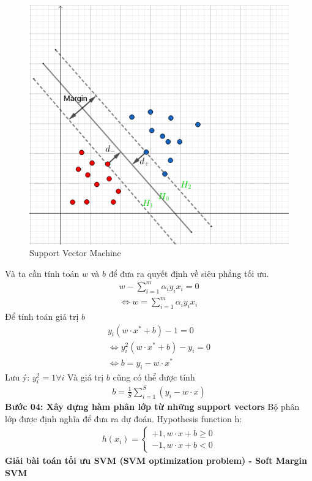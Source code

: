 \documentclass{article}
\begin{document}
	\begin{figure}[H]
		\centering
		\includegraphics[width=0.75\linewidth]{images/svm.png}
		\caption{Support Vector Machine}
		\label{fig:writing-thesis}
	\end{figure}
	Và ta cần tính toán $w$ và $b$ để đưa ra quyết định về siêu phẳng tối ưu.
	\begin{gather*}
		w - \sum_{i=1}^m\alpha_iy_ix_i = 0\\
		\Leftrightarrow w = \sum_{i=1}^m\alpha_iy_ix_i
	\end{gather*}
	Để tính toán giá trị $b$
	\begin{gather*}
		y_i(w \cdot x^{*} + b) - 1 = 0\\
		\Leftrightarrow y_i^2(w \cdot x^{*} + b) - y_i = 0\\
		\Leftrightarrow b = y_i - w \cdot x^{*} 
	\end{gather*}
	Lưu ý: $y_i^2 = 1 \forall i$
	Và giá trị $b$ cũng có thể được tính
	\begin{gather*}
		b = \frac{1}{S}\sum_{i=1}^S(y_i - w \cdot x)
	\end{gather*}
	\textbf{Bước 04: Xây dựng hàm phân lớp từ những support vectors}\newline
	Bộ phân lớp được định nghĩa để đưa ra dự đoán. Hypothesis function h:
	\begin{gather*}
		h(x_i) = \begin{cases}+1, w \cdot x + b \geq 0\\ -1,  w \cdot x + b < 0\end{cases}
	\end{gather*}
	\textbf{Giải bài toán tối ưu SVM (SVM optimization problem) - Soft Margin SVM}\newline
	
\end{document}
